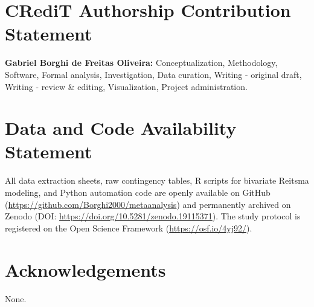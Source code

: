 \documentclass[preprint,11pt]{elsarticle}
\begin{document}
\section*{CRediT Authorship Contribution Statement}
\textbf{Gabriel Borghi de Freitas Oliveira:} Conceptualization, Methodology, Software, Formal analysis, Investigation, Data curation, Writing - original draft, Writing - review \& editing, Visualization, Project administration.

\section*{Data and Code Availability Statement}
All data extraction sheets, raw contingency tables, R scripts for bivariate Reitsma modeling, and Python automation code are openly available on GitHub (\url{https://github.com/Borghi2000/metaanalysis}) and permanently archived on Zenodo (DOI: \url{https://doi.org/10.5281/zenodo.19115371}). The study protocol is registered on the Open Science Framework (\url{https://osf.io/4yj92/}).

\section*{Acknowledgements}
None.



\end{document}
